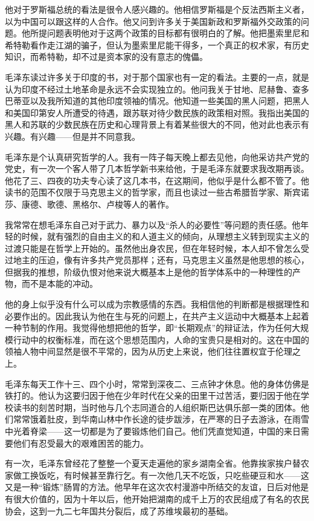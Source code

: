 \documentclass[10pt]{book}
\begin{document}
他对于罗斯福总统的看法是很令人感兴趣的。他相信罗斯福是个反法西斯主义者，以为中国可以跟这样的人合作。他又问到许多关于美国新政和罗斯福外交政策的问题。他所提问题表明他对于这两个政策的目标都有很明白的了解。他把墨索里尼和希特勒看作走江湖的骗子，但认为墨索里尼能干得多，一个真正的权术家，有历史知识，而希特勒，却不过是资本家的没有意志的傀儡。

毛泽东读过许多关于印度的书，对于那个国家也有一定的看法。主要的一点，就是认为印度不经过土地革命是永远不会实现独立的。他问我关于甘地、尼赫鲁、查多巴蒂亚以及我所知道的其他印度领袖的情况。他知道一些美国的黑人问题，把黑人和美国印第安人所遭受的待遇，跟苏联对待少数民族的政策相对照。我指出美国的黑人和苏联的少数民族在历史和心理背景上有着某些很大的不同，他对此也表示有兴趣。有兴趣——但是并不同意我。

毛泽东是个认真研究哲学的人。我有一阵子每天晚上都去见他，向他采访共产党的党史，有一次一个客人带了几本哲学新书来给他，于是毛泽东就要求我改期再谈。他花了三、四夜的功夫专心读了这几本书，在这期间，他似乎是什么都不管了。他读书的范围不仅限于马克思主义的哲学家，而且也读过一些古希腊哲学家、斯宾诺莎、康德、歌德、黑格尔、卢梭等人的著作。

我常常在想毛泽东自己对于武力、暴力以及“杀人的必要性”等问题的责任感。他年轻的时候，就有强烈的自由主义的和人道主义的倾向，从理想主义转到现实主义的过渡只能是在哲学上开始的。虽然他出身农民，但在年轻时候，本人却不曾怎么受过地主的压迫，像有许多共产党员那样；还有，马克思主义虽然是他思想的核心，但据我的推想，阶级仇恨对他来说大概基本上是他的哲学体系中的一种理性的产物，而不是本能的冲动。

他的身上似乎没有什么可以成为宗教感情的东西。我相信他的判断都是根据理性和必要作出的。因此我认为他在生与死的问题上，在共产主义运动中大概基本上起着一种节制的作用。我觉得他想把他的哲学，即“长期观点”的辩证法，作为任何大规模行动中的权衡标准，而在这个思想范围内，人命的宝贵只是相对的。这在中国的领袖人物中间显然是很不平常的，因为从历史上来说，他们往往置权宜于伦理之上。

毛泽东每天工作十三、四个小时，常常到深夜二、三点钟才休息。他的身体仿佛是铁打的。他认为这要归因于他在少年时代在父亲的田里干过苦活，要归因于他在学校读书的刻苦时期，当时他与几个志同道合的人组织斯巴达俱乐部一类的团体。他们常常饿着肚皮，到华南山林中作长途的徒步跋涉，在严寒的日子去游泳，在雨雪中光着脊梁——这一切都是为了要锻炼他们自己。他们凭直觉知道，中国的来日需要他们有忍受最大的艰难困苦的能力。

有一次，毛泽东曾经花了整整一个夏天走遍他的家乡湖南全省。他靠挨家挨户替农家做工换饭吃，有时候甚至靠行乞。有一次他几天不吃饭，只吃些硬豆和水——这又是一种“锻炼”肠胃的方法。他早年在这次农村漫游中所结交的友谊，日后对他是有很大价值的，因为十年以后，他开始把湖南的成千上万的农民组成了有名的农民协会，这到一九二七年国共分裂后，成了苏维埃最初的基础。
\end{document}
